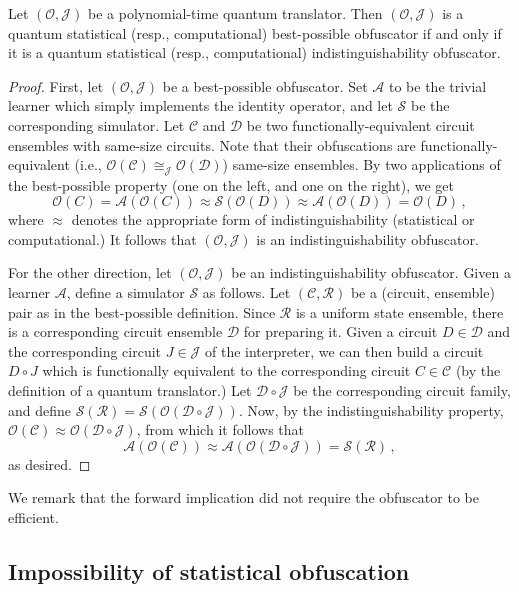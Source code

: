\documentclass[envcountsame]{llncs}
\numberwithin{equation}{section}
\newcommand{\algo}{\mathcal}
\begin{document}
\begin{proposition} Let $(\algo O, \algo J)$ be a polynomial-time quantum translator. Then $(\algo O, \algo J)$ is a quantum statistical (resp., computational) best-possible obfuscator if and only if it is a quantum statistical (resp., computational) indistinguishability obfuscator.
\end{proposition}
\begin{proof}
First, let $(\algo O, \algo J)$ be a best-possible obfuscator. Set $\mathcal A$ to be the trivial learner which simply implements the identity operator, and let $\mathcal S$  be the corresponding simulator. Let $\mathcal C$ and $\mathcal D$ be two functionally-equivalent circuit ensembles with same-size circuits. Note that their obfuscations are functionally-equivalent (i.e., $\algo O(\mathcal C) \cong_{\algo J} \algo O(\mathcal D)$) same-size ensembles. By two applications of the best-possible property (one on the left, and one on the right), we get
$$
\algo O(C) = \algo A(\algo O(C)) \approx \algo S(\algo O(D)) \approx \algo A(\algo O(D)) = \algo O(D)\,,
$$
where $\approx$ denotes the appropriate form of indistinguishability (statistical or computational.) It follows that $(\algo O, \algo J)$  is an indistinguishability obfuscator.

For the other direction, let $(\algo O, \algo J)$ be an indistinguishability obfuscator. Given a learner $\algo A$, define a simulator $\algo S$ as follows. Let $(\mathcal C, \mathcal R)$ be a (circuit, ensemble) pair as in the best-possible definition. Since $\mathcal R$ is a uniform state ensemble, there is a corresponding circuit ensemble $\mathcal D$ for preparing it. Given a circuit $D \in \mathcal D$ and the corresponding circuit $J \in \algo J$ of the interpreter, we can then build a circuit $D \circ J$ which is functionally equivalent to the corresponding circuit $C \in \mathcal C$ (by the definition of a quantum translator.) Let $\mathcal {D \circ J}$ be the corresponding circuit family, and define $\algo S ( \mathcal R ) = \algo S ( \algo O ( \mathcal {D \circ J}))$. Now, by the indistinguishability property, $\algo O(\mathcal C) \approx \algo O (\mathcal {D \circ J})$, from which it follows that 
$$
\algo A( \algo O(\mathcal C)) \approx \algo A( \algo O(\mathcal {D \circ J})) = \algo S(\mathcal R)\,,
$$
as desired.
\end{proof}

We remark that the forward implication did not require the obfuscator to be efficient.

\subsection{Impossibility of statistical obfuscation}
\end{document}
